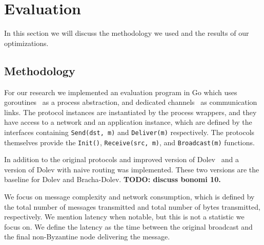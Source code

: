 \section{Evaluation}
\label{eval}



In this section we will discuss the methodology we used and the results of our optimizations.

\subsection{Methodology}
For our research we implemented an evaluation program in Go which uses goroutines~\cite{goroutines} as a process abstraction, and dedicated channels~\cite{channels} as communication links. The protocol instances are instantiated by the process wrappers, and they have access to a network and an application instance, which are defined by the interfaces containing \texttt{Send(dst, m)} and \texttt{Deliver(m)} respectively. The protocols themselves provide the \texttt{Init()}, \texttt{Receive(src, m)}, and \texttt{Broadcast(m)} functions.

In addition to the original protocols and improved version of Dolev~\cite{bonomi2019multihop} and a version of Dolev with naive routing was implemented. These two versions are the baseline for Dolev and Bracha-Dolev. 
\textbf{TODO: discuss bonomi 10.}

We focus on message complexity and network consumption, which is defined by the total number of messages transmitted and total number of bytes transmitted, respectively. We mention latency when notable, but this is not a statistic we focus on. We define the latency as the time between the original broadcast and the final non-Byzantine node delivering the message. 

